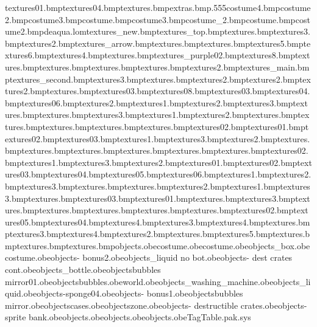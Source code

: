 textures\diamond01.bmp textures\coins04.bmp textures\fishgreen.bmp extras\map.bmp.555 costume\tongueline4.bmp costume\bodyeyebrow2.bmp costume\eyetex3.bmp costume\muzzlestubble.bmp costume\bodytoes3.bmp costume_2.bmp costume\noseshine.bmp costume\earslined2.bmp deaqua.lom textures\workcrate_new.bmp textures\workcrate_top.bmp textures\cardbox.bmp textures\cardbox3.bmp textures\cardbox2.bmp textures\crate_arrow.bmp textures\crate.bmp textures\wastepipes.bmp textures\wastepipes5.bmp textures\wastepipes6.bmp textures\wastepipes4.bmp textures\safariwater.bmp textures\marbtiles_purple02.bmp textures\lifehut8.bmp textures\tapside.bmp textures\tapcold.bmp textures\lighthouseblue.bmp textures\lighthousered.bmp textures\aquaropeholds2.bmp textures\aqua_main.bmp textures\aqua_second.bmp textures\washliquid3.bmp textures\washliquid.bmp textures\washliquid2.bmp textures\washupbottle2.bmp textures\sponge2.bmp textures\sponge.bmp textures\feather03.bmp textures\anvil08.bmp textures\anvil03.bmp textures\anvil04.bmp textures\anvil06.bmp textures\strings2.bmp textures\white1.bmp textures\white2.bmp textures\white3.bmp textures\starfish.bmp textures\spade.bmp textures\purple3.bmp textures\purple1.bmp textures\purple2.bmp textures\pegleg.bmp textures\float.bmp textures\piratehat.bmp textures\lifebuoy.bmp textures\duck.bmp textures\diamond02.bmp textures\goldnugget01.bmp textures\goldnugget02.bmp textures\goldnugget03.bmp textures\green1.bmp textures\green3.bmp textures\green2.bmp textures\hook.bmp textures\fish.bmp textures\fishyellow.bmp textures\aquapoles.bmp textures\washupbottle.bmp textures\bakedbean.bmp textures\coins02.bmp textures\yellow1.bmp textures\yellow3.bmp textures\yellow2.bmp textures\splinter01.bmp textures\splinter02.bmp textures\splinter03.bmp textures\splinter04.bmp textures\splinter05.bmp textures\splinter06.bmp textures\red1.bmp textures\red2.bmp textures\red3.bmp textures\ring.bmp textures\necklace.bmp textures\blue2.bmp textures\blue1.bmp textures\blue3.bmp textures\eyepatch.bmp textures\whackbit03.bmp textures\whackbit01.bmp textures\cereal.bmp textures\clothes3.bmp textures\banana.bmp textures\geniebottle.bmp textures\scroll.bmp textures\beachball.bmp textures\cutlass.bmp textures\whackbit02.bmp textures\whackbit05.bmp textures\whackbit04.bmp textures\clothes4.bmp textures\sponge3.bmp textures\sponge4.bmp textures\washmglass.bmp textures\washcase3.bmp textures\washcase4.bmp textures\washcase2.bmp textures\washcase.bmp textures\washcase5.bmp textures\washmdrumb.bmp textures\washmdrum.bmp textures\washmbubbles.bmp objects\water.obe costume\aquasurfboard.obe costume\tazaquasurfer.obe objects\background_box.obe costume\aquashades.obe objects\bank - bonus2.obe objects\washing_liquid no bot.obe objects\bank - dest crates cont.obe objects\washingliquid_bottle.obe objects\washing bubbles mirror01.obe objects\washing bubbles.obe world.obe objects\bank_washing_machine.obe objects\washing_liquid.obe objects\drop-sponge04.obe objects\bank - bonus1.obe objects\washing bubbles mirror.obe objects\camera cases.obe objects\drop zone.obe objects\bank - destructible crates.obe objects\bank - sprite bank.obe objects\stand.obe objects\startpoint.obe objects\sponge.obe TagTable.pak.sys 